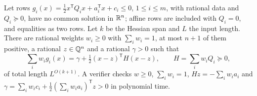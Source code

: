 \begin{theorem}
\label{thm:qc-rational-infeasibility}
Let rows $g_i(x)=\tfrac12x^{\mathsf T}Q_ix+a_i^{\mathsf T}x+c_i\le0$,
$1\le i\le m$, with rational data and $Q_i\succeq0$, have no common solution
in $\mathbb R^n$; affine rows are included with $Q_i=0$, and equalities as two rows.
Let $k$ be the Hessian span and $L$ the input length. There are rational
weights $w_i\ge0$ with $\sum_iw_i=1$, at most $n+1$ of them positive, a
rational $z\in\mathbb Q^n$ and a rational $\gamma>0$ such that
\begin{equation}
\label{eq:qc-rational-aggregate}
\sum_iw_ig_i(x)=\gamma+\tfrac12(x-z)^{\mathsf T}H(x-z),\qquad
H=\sum_iw_iQ_i\succeq0,
\end{equation}
of total length $L^{O(k+1)}$. A verifier checks $w\ge0$, $\sum_iw_i=1$,
$Hz=-\sum_iw_ia_i$ and $\gamma=\sum_iw_ic_i+\tfrac12(\sum_iw_ia_i)^{\mathsf
T}z>0$ in polynomial time.
\end{theorem}

